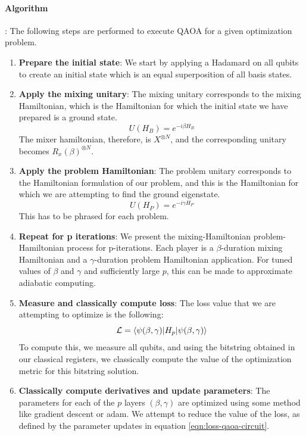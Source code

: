\paragraph*{Algorithm}: The following steps are performed to execute QAOA for a given optimization problem.
\begin{enumerate}
    \item \textbf{Prepare the initial state}: We start by applying a Hadamard on all qubits to create an initial state which is an equal superposition of all basis states.
    \item \textbf{Apply the mixing unitary}: The mixing unitary corresponds to the mixing Hamiltonian, which is the Hamiltonian for which the initial state we have prepared is a ground state.
    \begin{equation}
        U(H_B) = e^{-i \beta H_B}
    \end{equation}
    The mixer hamiltonian, therefore, is $X^{\otimes N}$, and the corresponding unitary becomes $R_x(\beta)^{\otimes N}$.
    \item \textbf{Apply the problem Hamiltonian}: The problem unitary corresponds to the Hamiltonian formulation of our problem, and this is the Hamiltonian for which we are attempting to find the ground eigenstate.
    \begin{equation}
        U(H_P) = e^{-i \gamma H_P}
    \end{equation}
    This has to be phrased for each problem.
    \item \textbf{Repeat for p iterations}: We present the mixing-Hamiltonian problem-Hamiltonian process for p-iterations. Each player is a $\beta$-duration mixing Hamiltonian and a $\gamma$-duration problem Hamiltonian application. For tuned values of $\beta$ and $\gamma$ and sufficiently large $p$, this can be made to approximate adiabatic computing.
    \item \textbf{Measure and classically compute loss}: The loss value that we are attempting to optimize is the following:
    \begin{equation}\label{eqn:loss-qaoa-circuit}
        \mathcal{L} = \braket{\psi(\beta, \gamma) \vert H_p \vert \psi(\beta, \gamma)}
    \end{equation}
    To compute this, we measure all qubits, and using the bitstring obtained in our classical registers, we classically compute the value of the optimization metric for this bitstring solution.
    \item \textbf{Classically compute derivatives and update parameters}: The parameters for each of the $p$ layers $(\beta, \gamma)$ are optimized using some method like gradient descent or adam. We attempt to reduce the value of the loss, as defined by the parameter updates in equation \ref{eqn:loss-qaoa-circuit}.
\end{enumerate}

